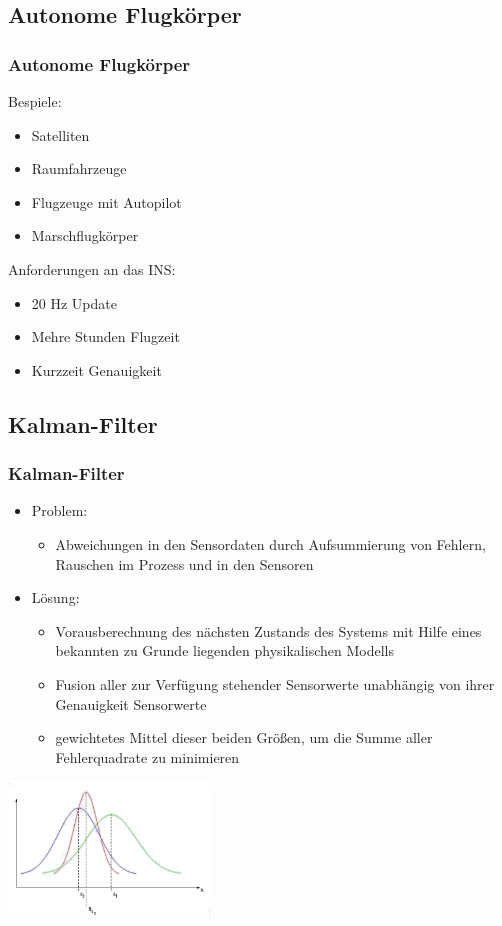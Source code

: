 \documentclass[10pt,a4paper,oneside]{beamer}
\begin{document}
\begin{frame}
	\section{Autonome Flugkörper}
	\frametitle{Autonome Flugkörper}
	Bespiele: 
	
	\begin{itemize}
		\item Satelliten
		\item Raumfahrzeuge
		\item Flugzeuge mit Autopilot
		\item Marschflugkörper
	\end{itemize}
	
	Anforderungen an das INS:\\
	\begin{itemize}
		\item 20 Hz Update
		\item Mehre Stunden Flugzeit
		\item Kurzzeit Genauigkeit
	\end{itemize}
	
\end{frame}


\begin{frame}
  \section{Kalman-Filter}
  \frametitle{Kalman-Filter}
  \begin{itemize}
  	\item Problem:
  		\begin{itemize}
  			\item Abweichungen in den Sensordaten durch Aufsummierung von Fehlern, Rauschen im Prozess und in den Sensoren
  		\end{itemize}
  	\item Lösung:
  		\begin{itemize}
  			\item Vorausberechnung des nächsten Zustands des Systems mit Hilfe eines bekannten zu Grunde liegenden physikalischen Modells
  			\item Fusion aller zur Verfügung stehender Sensorwerte unabhängig von ihrer Genauigkeit Sensorwerte
  			\item gewichtetes Mittel dieser beiden Größen, um die Summe aller Fehlerquadrate zu minimieren
  		\end{itemize}
  \end{itemize}
  \includegraphics[width=0.4\textwidth]{images/Grundkurven.jpg}
\end{frame}
\end{document}
